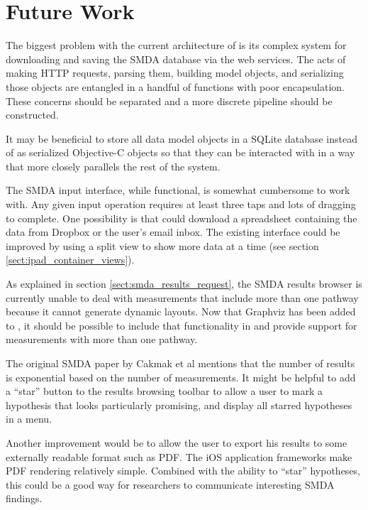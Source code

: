 \section{Future Work}
\label{sect:maw_future_work}

The biggest problem with the current architecture of \mawapp is its complex
system for downloading and saving the SMDA database via the web services. The
acts of making HTTP requests, parsing them, building model objects, and
serializing those objects are entangled in a handful of functions with poor
encapsulation. These concerns should be separated and a more discrete pipeline
should be constructed.

It may be beneficial to store all data model objects in a SQLite database
instead of as serialized Objective-C objects so that they can be interacted with
in a way that more closely parallels the rest of the \pathcasemaw system.

The SMDA input interface, while functional, is somewhat cumbersome to work with.
Any given input operation requires at least three taps and lots of dragging to
complete. One possibility is that \mawapp could download a spreadsheet
containing the data from Dropbox or the user's email inbox. The existing
interface could be improved by using a split view to show more data at a time
(see section \ref{sect:ipad_container_views}).

As explained in section \ref{sect:smda_results_request}, the SMDA results
browser is currently unable to deal with measurements that include more than one
pathway because it cannot generate dynamic layouts. Now that Graphviz has been
added to \keggapp, it should be possible to include that functionality in
\mawapp and provide support for measurements with more than one pathway.

The original SMDA paper by Cakmak et al \cite{smda-basic} mentions that the
number of results is exponential based on the number of measurements. It might
be helpful to add a ``star'' button to the results browsing toolbar to allow a
user to mark a hypothesis that looks particularly promising, and display all
starred hypotheses in a menu.

Another improvement would be to allow the user to export his results to some
externally readable format such as PDF. The iOS application frameworks make PDF
rendering relatively simple. Combined with the ability to ``star'' hypotheses,
this could be a good way for researchers to communicate interesting SMDA
findings.
